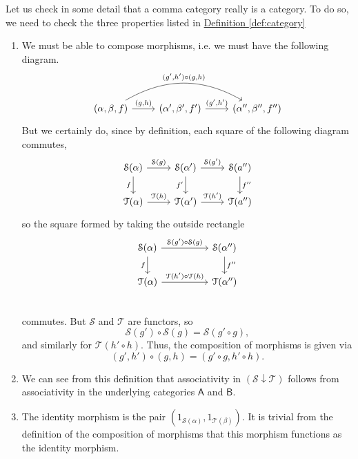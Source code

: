 \documentclass[a4paper]{report}
\theoremstyle{definition}
\theoremstyle{plain}
\theoremstyle{remark}
\begin{document}
Let us check in some detail that a comma category really is a category. To do so, we need to check the three properties listed in \hyperref[def:category]{Definition \ref*{def:category}}
\begin{enumerate}
  \item We must be able to compose morphisms, i.e. we must have the following diagram.
    \begin{equation*}
      \begin{tikzcd}
        {(\alpha, \beta, f)} \arrow[r, "{(g,h)}"] \arrow[rr, bend left, "{(g', h') \circ (g, h)}"] & {(\alpha', \beta', f')} \arrow[r, "{(g', h')}"] & {(\alpha'', \beta'', f'')}
      \end{tikzcd}
    \end{equation*}
    But we certainly do, since by definition, each square of the following diagram commutes,
    \begin{equation*}
      \begin{tikzcd}
        \mathcal{S}(\alpha) \arrow[r, "\mathcal{S}(g)"] \arrow[d, swap, "f"] & \mathcal{S}(\alpha') \arrow[r, "\mathcal{S}(g')"] \arrow[d, swap, "f'"] & \mathcal{S}(a'') \arrow[d, "f''"] \\
        \mathcal{T}(\alpha) \arrow[r, "\mathcal{T}(h)"] & \mathcal{T}(\alpha') \arrow[r, "\mathcal{T}(h')"] & \mathcal{T}(a'') 
      \end{tikzcd}
    \end{equation*}
    so the square formed by taking the outside rectangle
    \begin{equation*}
      \begin{tikzcd}[column sep=huge]
        \mathcal{S}(\alpha) \arrow[d, swap, "f"] \arrow[r, "\mathcal{S}(g') \circ \mathcal{S}(g)"] & \mathcal{S}(\alpha'') \arrow[d, "f''"] \\
        \mathcal{T}(\alpha) \arrow[r, "\mathcal{T}(h') \circ \mathcal{T}(h)"] & \mathcal{T}(\alpha'') \\
      \end{tikzcd}
    \end{equation*}
    commutes. But $\mathcal{S}$ and $\mathcal{T}$ are functors, so 
    \begin{equation*}
      \mathcal{S}(g') \circ \mathcal{S}(g) = \mathcal{S}(g' \circ g),
    \end{equation*}
    and similarly for $\mathcal{T}(h' \circ h)$. Thus, the composition of morphisms is given via
    \begin{equation*}
      (g', h') \circ (g,h) = (g'\circ g, h' \circ h).
    \end{equation*}

  \item We can see from this definition that associativity in $(\mathcal{S}\downarrow \mathcal{T})$ follows from associativity in the underlying categories $\mathsf{A}$ and $\mathsf{B}$.

  \item The identity morphism is the pair $(1_{\mathcal{S}(\alpha)}, 1_{\mathcal{T}(\beta)})$. It is trivial from the definition of the composition of morphisms that this morphism functions as the identity morphism.
\end{enumerate}
\end{document}
